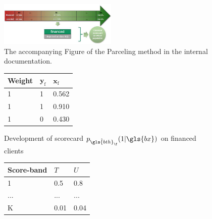 \begin{figure}
\centering
\includegraphics[width=0.5\textwidth]{figures/appendix/processusParcelling.png}
\caption{The accompanying Figure of the Parceling method in the internal documentation.}
\label{fig:parceling}
\end{figure}


\begin{table}
\caption{\label{parcel} Example of implementation of the Parcelling method on a small dataset}
{\setlength{\parindent}{0cm}
\begin{multicols}{3}

\begin{subfigure}[t]{0.31\textwidth}
\begin{center}
\begin{adjustbox}{max width=\textwidth}
\begin{tabular}{l l l}
\toprule
\textbf{Weight} & \textbf{${\bm{y}}_{\text{f}}$} & \textbf{${\bm{x}}_{\text{f}}$}\\
\midrule
1 & 1 & 0.562 \\
1 & 1 & 0.910 \\
1 & 0 & 0.430 \\
\bottomrule
\end{tabular}
\end{adjustbox}
\end{center}

\caption{Development of scorecard $p_{\hat{\gls{bth}}_\f}(1 | \gls{bx})$ on financed clients}
\label{parcel:sfig1}
\end{subfigure}

\columnbreak

\begin{subfigure}[t]{0.31\textwidth}
\begin{center}
\begin{adjustbox}{max width=\textwidth}
\begin{tabular}{l l l}
\toprule
\textbf{Score-band} & \textbf{$T$} &  \textbf{$U$} \\
\midrule
1 & 0.5 & 0.8 \\
... & ... & ... \\
K & 0.01 & 0.04 \\
\bottomrule
\end{tabular}
\end{adjustbox}
\end{center}


\end{subfigure}
\end{multicols}}
\end{table}
